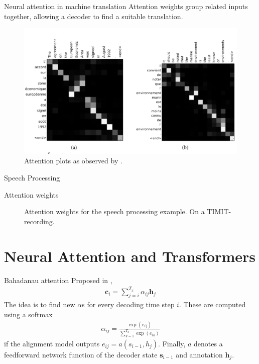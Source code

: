 \documentclass{beamer}
\begin{document}
    \begin{frame}{Neural attention in machine translation}
      Attention weights group related inputs together,
      allowing a decoder to find a suitable translation.
      \begin{figure}
      \includegraphics[scale=0.2]{./figures/attention.png}
      \caption{Attention plots as observed by \cite{Bahdanau2015NeuralMT}.}
      \end{figure}
    \end{frame}

    \begin{frame}{Speech Processing \cite{chan2015listen}}
      \begin{figure}
        
      \end{figure}
    \end{frame}

    \begin{frame}{Attention weights}
      \begin{figure}
        
        \caption{Attention weights for the speech processing example. On a TIMIT-recording.}
      \end{figure}
    \end{frame}

    \section{Neural Attention and Transformers}
    \begin{frame}{Bahadanau attention}
      Proposed in \cite{Bahdanau2015NeuralMT},
      \begin{align}
        \mathbf{c}_i = \sum_{j=i}^{T_x} \alpha_{ij} \mathbf{h}_j
      \end{align}
      The idea is to find new $\alpha$s for every decoding time step $i$. 
      These are computed using a softmax 
      \begin{align}
        \alpha_{ij} = \frac{\exp(e_{ij})}{\sum_{k=1}^{T_x} \exp(e_{ik})}
      \end{align}
      if the alignment model outputs $e_{ij} = a(s_{i-1}, h_j)$.
      Finally, $a$ denotes a feedforward network function of the decoder state $\mathbf{s}_{i-1}$ and annotation $\mathbf{h}_j$.
    \end{frame}
\end{document}
